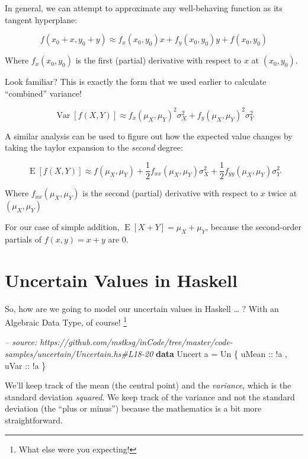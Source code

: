 \documentclass[]{article}
\newenvironment{Shaded}{}{}
\newcommand{\KeywordTok}[1]{\textcolor[rgb]{0.00,0.44,0.13}{\textbf{{#1}}}}
\newcommand{\DataTypeTok}[1]{\textcolor[rgb]{0.56,0.13,0.00}{{#1}}}
\newcommand{\CommentTok}[1]{\textcolor[rgb]{0.38,0.63,0.69}{\textit{{#1}}}}
\newcommand{\OtherTok}[1]{\textcolor[rgb]{0.00,0.44,0.13}{{#1}}}
\newcommand{\FunctionTok}[1]{\textcolor[rgb]{0.02,0.16,0.49}{{#1}}}
\newcommand{\NormalTok}[1]{{#1}}
\begin{document}
In general, we can attempt to approximate any well-behaving function as
its tangent hyperplane:

\[
f(x_0 + x, y_0 + y) \approx f_x(x_0, y_0) x + f_y(x_0, y_0) y + f(x_0, y_0)
\]

Where \(f_x(x_0,y_0)\) is the first (partial) derivative with respect to
\(x\) at \((x_0, y_0)\).

Look familiar? This is exactly the form that we used earlier to
calculate ``combined'' variance!

\[
\operatorname{Var}[f(X,Y)] \approx f_x(\mu_X, \mu_Y)^2 \sigma_X^2 + f_y(\mu_X,\mu_Y)^2 \sigma_Y^2
\]

A similar analysis can be used to figure out how the expected value
changes by taking the taylor expansion to the \emph{second} degree:

\[
\operatorname{E}[f(X,Y)] \approx
f(\mu_X, \mu_Y) +
\frac{1}{2} f_{xx}(\mu_X, \mu_Y) \sigma_X^2 +
\frac{1}{2} f_{yy}(\mu_X, \mu_Y) \sigma_Y^2
\]

Where \(f_{xx}(\mu_X, \mu_Y)\) is the second (partial) derivative with
respect to \(x\) twice at \((\mu_X, \mu_Y)\)

For our case of simple addition,
\(\operatorname{E}[X + Y] = \mu_X + \mu_Y\), because the second-order
partials of \(f(x,y) = x + y\) are 0.

\section{Uncertain Values in Haskell}\label{uncertain-values-in-haskell}

So, how are we going to model our uncertain values in Haskell \ldots{} ?
With an Algebraic Data Type, of course! \footnote{What else were you
  expecting!}

\begin{Shaded}
\begin{Highlighting}[]
\CommentTok{-- source: https://github.com/mstksg/inCode/tree/master/code-samples/uncertain/Uncertain.hs#L18-20}
\KeywordTok{data} \DataTypeTok{Uncert} \NormalTok{a }\FunctionTok{=} \DataTypeTok{Un} \NormalTok{\{}\OtherTok{ uMean ::} \FunctionTok{!}\NormalTok{a}
                   \NormalTok{,}\OtherTok{ uVar  ::} \FunctionTok{!}\NormalTok{a}
                   \NormalTok{\}}
\end{Highlighting}
\end{Shaded}

We'll keep track of the mean (the central point) and the
\emph{variance}, which is the standard deviation \emph{squared}. We keep
track of the variance and not the standard deviation (the ``plus or
minus'') because the mathematics is a bit more straightforward.
\end{document}

